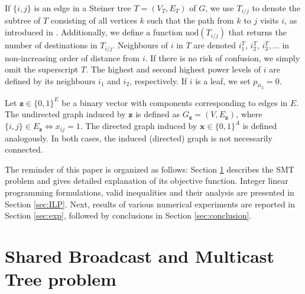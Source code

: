 If $\{i,j\}$ is an edge in a Steiner tree $T=(V_T,E_T)$ of $G$, we use $T_{i/j}$ to denote the subtree of $T$ consisting of all vertices $k$ such that the path from $k$ to $j$ visits $i$, as introduced in \cite{Haugland12Dual}. Additionally, we define a function $\text{nod}(T_{i/j})$ that returns the number of destinations in $T_{i/j}$. Neighbours of $i$ in $T$ are denoted $i^T_1$, $i^T_2$, $i^T_3, \dots$ in non-increasing order of distance from $i$. If there is no risk of confusion, we simply omit the superscript $T$. The highest and second highest power levels of $i$ are defined by its neighbours $i_1$ and $i_2$, respectively. If $i$ is a leaf, we set $p_{ii_2}=0$.

Let $\mathbf{z} \in \{0,1\}^E$ be a binary vector with components corresponding to edges in $E$. The undirected graph induced by $\mathbf{z}$ is defined as  $G_\mathbf{z}=(V,E_\mathbf{z})$, where $\{i,j\}\in E_\mathbf{z}\Leftrightarrow x_{ij}=1$. The directed graph induced by $\mathbf{x} \in \{0,1\}^A$ is defined analogously. In both cases, the induced (directed) graph is not necessarily connected.  

The reminder of this paper is organized as follows: Section \ref{sec:SBT} describes the SMT problem and gives detailed explanation of its objective function. Integer linear programming formulations, valid inequalities and their analysis are presented in Section \ref{sec:ILP}. Next, results of various numerical experiments are reported in Section \ref{sec:exp}, followed by conclusions in Section \ref{sec:conclusion}.
\section{Shared Broadcast and Multicast Tree problem}
\label{sec:SBT}

